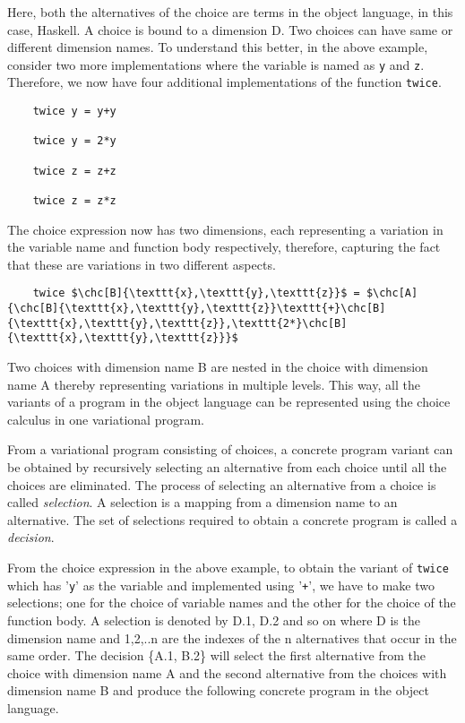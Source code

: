 Here, both the alternatives of the choice are terms in the object language, in this case, Haskell.
A choice is bound to a dimension D. Two choices can have same or different dimension names. To understand this better, in the above example, consider two more implementations where the variable is named as \texttt{y} and \texttt{z}. Therefore, we now have four additional implementations of the function \texttt{twice}.

\begin{lstlisting}
	twice y = y+y
        
	twice y = 2*y
        
	twice z = z+z
        
	twice z = z*z
\end{lstlisting}
        
The choice expression now has two dimensions, each representing a variation in the variable name and function body respectively, therefore, capturing the fact that these are variations in two different aspects.

\begin{lstlisting}  
	twice $\chc[B]{\texttt{x},\texttt{y},\texttt{z}}$ = $\chc[A]{\chc[B]{\texttt{x},\texttt{y},\texttt{z}}\texttt{+}\chc[B]{\texttt{x},\texttt{y},\texttt{z}},\texttt{2*}\chc[B]{\texttt{x},\texttt{y},\texttt{z}}}$ 
\end{lstlisting}


Two choices with dimension name B are nested in the choice with dimension name A thereby representing variations in multiple levels. This way, all the variants of a program in the object language can be represented using the choice calculus in one variational program.

From a variational program consisting of choices, a concrete program variant can be obtained by recursively selecting an alternative from each choice until all the choices are eliminated. The process of selecting an alternative from a choice is called \textit{selection}. A selection is a mapping from a dimension name to an alternative. The set of selections required to obtain a concrete program is called a \textit{decision}.

From the choice expression in the above example, to obtain the variant of \texttt{twice} which has '\texttt{y}' as the variable and implemented using '\texttt{+}', we have to make two selections; one for the choice of variable names and the other for the choice of the function body. A selection is denoted by D.1, D.2 and so on where D is the dimension name and 1,2,..n are the indexes of the n alternatives that occur in the same order. The decision \{A.1, B.2\} will select the first alternative from the choice with dimension name A and the second alternative from the choices with dimension name B and produce the following concrete program in the object language.

